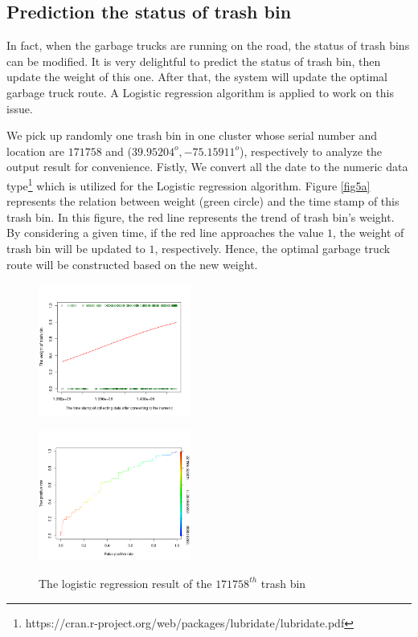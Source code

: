 \documentclass[conference]{IEEEtran}
\begin{document}
\subsection{Prediction the status of trash bin} 

In fact, when the garbage trucks are running on the road, the status of trash bins can be modified. It is very delightful to predict the status of trash bin, then update the weight of this one. After that, the system will update the optimal garbage truck route. A Logistic regression algorithm is applied to work on this issue. 

We pick up randomly one trash bin in one cluster whose serial number and location are $171758$ and ($39.95204^o,-75.15911^o$), respectively to analyze the output result for convenience. Fistly, We convert all the date to the numeric data type\footnote{https://cran.r-project.org/web/packages/lubridate/lubridate.pdf} which is utilized for the Logistic regression algorithm. Figure \ref{fig5a} represents the relation between weight (green circle) and the time stamp of this trash bin. In this figure, the red line represents the trend of trash bin's weight. By considering a given time, if the red line approaches the value $1$, the weight of trash bin will be updated to $1$, respectively. Hence, the optimal garbage truck route will be constructed based on the new weight.
\begin{figure}
	\centering

	\begin{minipage}{5cm}
	\includegraphics[width=5cm]{regression}
	\label{fig5a}
\end{minipage}
	\begin{minipage}{5cm}
	\includegraphics[width=5cm]{roc}
	\label{fig5b}
\end{minipage}
\label{fig5}
	\caption{The logistic regression result of the $171758^{th}$ trash bin}
\end{figure}
\end{document}
